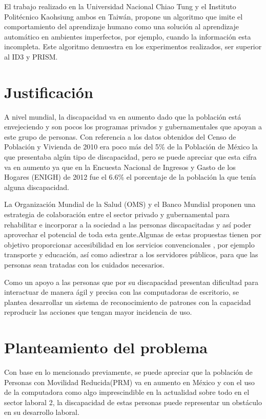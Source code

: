 El trabajo realizado en la Universidad Nacional Chiao Tung y el Instituto
 Politécnico Kaohsiung ambos en Taiwán\cite{Chang1996}, propone un algoritmo
 que imite el comportamiento del aprendizaje humano como una solución al
 aprendizaje automático en ambientes imperfectos, por ejemplo, cuando la
 información esta incompleta. Este algoritmo demuestra en los experimentos
 realizados, ser superior al ID3 y PRISM.


\section{Justificación}
A nivel mundial, la discapacidad va en aumento dado que la población está
 envejeciendo y son pocos los programas privados y gubernamentales que apoyan a
 este grupo de personas\cite{OrganizacionMundialdelaSalud2011}. 
 Con referencia a los datos obtenidos del Censo de Población
 y Vivienda de 2010 era poco más del 5\% de la Población de México la que
 presentaba algún tipo de discapacidad, pero se puede apreciar que esta cifra va
 en aumento ya que en la Encuesta Nacional de Ingresos y Gasto de los Hogares
 (ENIGH) de 2012 fue el 6.6\% el porcentaje de la población la que tenía alguna
 discapacidad\cite{Milosavljevic2014}.
 


 
La Organización Mundial de la Salud (OMS) y el Banco Mundial
\cite{OrganizacionMundialdelaSalud2011} proponen una
 estrategia de colaboración entre el sector privado y gubernamental para
 rehabilitar e incorporar a la sociedad a las personas discapacitadas y así
 poder aprovechar el potencial de toda esta gente.Algunas de estas propuestas
 tienen por objetivo proporcionar accesibilidad en los servicios convencionales
 , por ejemplo transporte y educación, así como adiestrar a los servidores
 públicos, para que las personas sean tratadas con los cuidados necesarios.
 
 
Como un apoyo a las personas que por su discapacidad presentan dificultad para
 interactuar de manera ágil y precisa con las computadoras de escritorio, se
 plantea desarrollar un sistema de reconocimiento de patrones con la capacidad
 reproducir las acciones que tengan mayor incidencia de uso.

\section{Planteamiento del problema}
Con base en lo mencionado previamente, se puede apreciar que la población de
 Personas con Movilidad Reducida(PRM) va en aumento en México y con el uso de
 la computadora como algo imprescindible en la actualidad sobre todo en el
 sector laboral 2, la discapacidad de estas personas puede representar un
 obstáculo en su desarrollo laboral.



